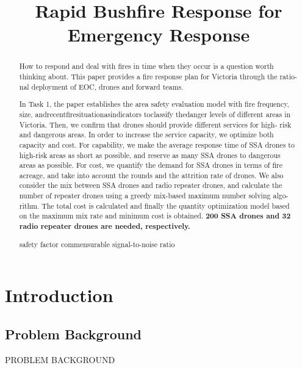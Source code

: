 \documentclass{mcmthesis}
\title{\textbf{\Large{Rapid Bushfire Response for Emergency Response}}}
\begin{document}
\begin{abstract}
	\qquad How to respond and deal with fires in time when they occur is a question worth
	thinking about. This paper provides a fire response plan for Victoria through the ratio-
	nal deployment of EOC, drones and forward teams.

	In Task 1, the paper establishes the area safety evaluation model with fire frequency,
	size, andrecentfiresituationasindicators toclassify thedanger levels of different areas
	in Victoria. Then, we confirm that drones should provide different services for high-
	risk and dangerous areas. In order to increase the service capacity, we optimize both
	capacity and cost. For capability, we make the average response time of SSA drones
	to high-risk areas as short as possible, and reserve as many SSA drones to dangerous
	areas as possible. For cost, we quantify the demand for SSA drones in terms of fire
	acreage, and take into account the rounds and the attrition rate of drones. We also
	consider the mix between SSA drones and radio repeater drones, and calculate the
	number of repeater drones using a greedy mix-based maximum number solving algo-
	rithm. The total cost is calculated and finally the quantity optimization model based on
	the maximum mix rate and minimum cost is obtained.\textbf{ 200 SSA drones and 32 radio
		repeater drones are needed, respectively.}
	\begin{keywords}
		safety factor \quad commensurable \quad signal-to-noise ratio
	\end{keywords}
\end{abstract}
\maketitle

\clearpage
\pagestyle{fancy}
\newpage
\setcounter{page}{1}

\newpage   %
\tableofcontents
\thispagestyle{empty}
\newpage

\section{Introduction}
\subsection{Problem Background}
PROBLEM BACKGROUND
\end{document}
